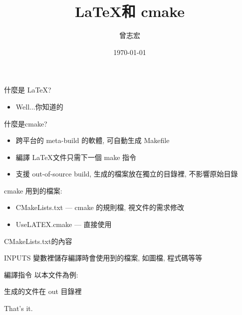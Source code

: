 \documentclass[aspectratio=169]{beamer}
\begin{document}
\author{曾志宏}
\title{\LaTeX 和 cmake}
\date{\today}

\begin{frame}
\maketitle
\end{frame}

\begin{frame}
什麼是 \LaTeX ?
\begin{itemize}
\item Well...你知道的
\end{itemize}

\bigskip

什麼是cmake\cite{cmake}?
\begin{itemize}
\item 跨平台的 meta-build 的軟體, 可自動生成 Makefile
\item 編譯 \LaTeX 文件只需下一個 make 指令
\item 支援 out-of-source build, 生成的檔案放在獨立的目錄裡, 不影響原始目錄
\end{itemize}
\end{frame}

\begin{frame}
cmake 用到的檔案:
\begin{itemize}
\item CMakeLists.txt --- cmake 的規則檔, 視文件的需求修改
\item UseLATEX.cmake\cite{UseLATEX} --- 直接使用
\end{itemize}
\end{frame}

\begin{frame}[fragile]{CMakeLists.txt的內容}


INPUTS 變數裡儲存編譯時會使用到的檔案, 如圖檔, 程式碼等等
\end{frame}

\begin{frame}[fragile]{編譯指令}
以本文件為例:



生成的文件在 out 目錄裡
\end{frame}

\begin{frame}
\Huge That's it.
\end{frame}



\end{document}

